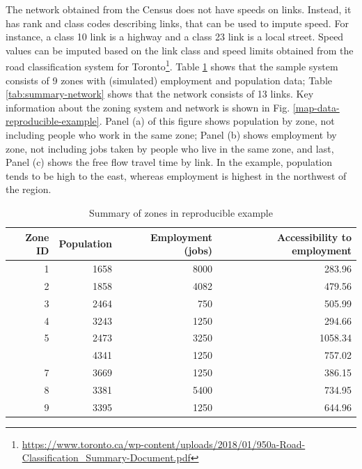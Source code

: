 \documentclass[]{elsarticle} %
\begin{document}
The network obtained from the Census does not have speeds on links.
Instead, it has rank and class codes describing links, that can be used
to impute speed. For instance, a class 10 link is a highway and a class
23 link is a local street. Speed values can be imputed based on the link
class and speed limits obtained from the road classification system for
Toronto\footnote{\url{https://www.toronto.ca/wp-content/uploads/2018/01/950a-Road-Classification_Summary-Document.pdf}}.
Table \ref{tab:summary-data} shows that the sample system consists of 9
zones with (simulated) employment and population data; Table
\ref{tab:summary-network} shows that the network consists of 13 links.
Key information about the zoning system and network is shown in Fig.
\ref{map-data-reproducible-example}. Panel (a) of this figure shows
population by zone, not including people who work in the same zone;
Panel (b) shows employment by zone, not including jobs taken by people
who live in the same zone, and last, Panel (c) shows the free flow
travel time by link. In the example, population tends to be high to the
east, whereas employment is highest in the northwest of the region.

\begin{table}[!h]

\caption{\label{tab:summary-data-reproducible-example}\label{tab:summary-data}Summary of zones in reproducible example}
\centering
\begin{tabular}[t]{rrrr}
\toprule
Zone ID & Population & Employment (jobs) & Accessibility to employment\\
\midrule
1 & 1658 & 8000 & 283.96\\
2 & 1858 & 4082 & 479.56\\
3 & 2464 & 750 & 505.99\\
4 & 3243 & 1250 & 294.66\\
5 & 2473 & 3250 & 1058.34\\
\addlinespace
6 & 4341 & 1250 & 757.02\\
7 & 3669 & 1250 & 386.15\\
8 & 3381 & 5400 & 734.95\\
9 & 3395 & 1250 & 644.96\\
\bottomrule
\end{tabular}
\end{table}
\end{document}
